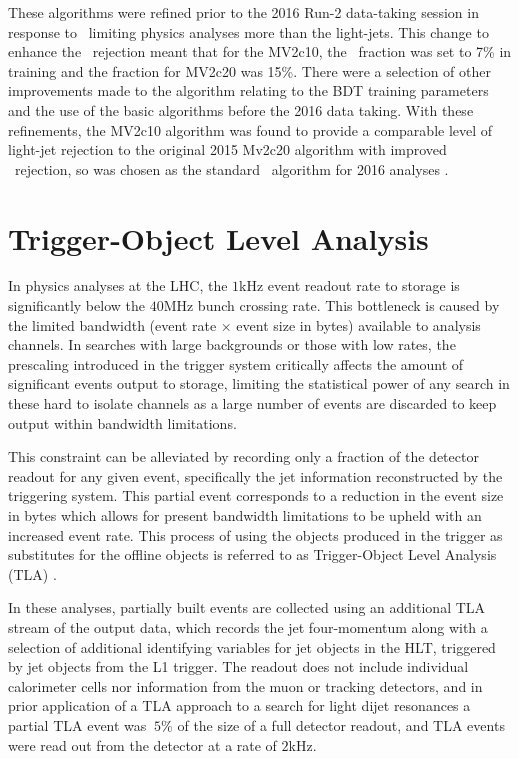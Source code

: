 	These algorithms were refined prior to the 2016 Run-2 data-taking session in response to \cjets\ limiting physics analyses more than the light-jets. This change  to enhance the \cjet\ rejection meant that for the MV2c10, the \cjet\ fraction was set to 7\% in training and the fraction for MV2c20 was 15\%. There were a selection of other improvements made to the algorithm relating to the BDT training parameters and the use of the basic algorithms before the 2016 data taking. With these refinements, the MV2c10 algorithm was found to provide a comparable level of light-jet rejection to the original 2015 Mv2c20 algorithm with improved \cjet\ rejection, so was chosen as the standard \btag\ algorithm for 2016 analyses \cite{btagOptimisation}.


\section{Trigger-Object Level Analysis}
\label{t:tla}

	In physics analyses at the LHC, the $1$kHz event readout rate to storage is significantly below the $40$MHz bunch crossing rate. This bottleneck is caused by the limited bandwidth (event rate $\times$ event size in bytes) available to analysis channels. In searches with large backgrounds or those with low rates, the prescaling introduced in the trigger system critically affects the amount of significant events output to storage, limiting the statistical power of any search in these hard to isolate channels as a large number of events are discarded to keep output within bandwidth limitations.

	This constraint can be alleviated by recording only a fraction of the detector readout for any given event, specifically the jet information reconstructed by the triggering system. This partial event corresponds to a reduction in the event size in bytes which allows for present bandwidth limitations to be upheld with an increased event rate. This process of using the objects produced in the trigger as substitutes for the offline objects is referred to as Trigger-Object Level Analysis (TLA) \cite{tla}.

	\newpage
	In these analyses, partially built events are collected using an additional TLA stream of the output data, which records the jet four-momentum along with a selection of additional identifying variables for jet objects in the HLT, triggered by jet objects from the L1 trigger. The readout does not include individual calorimeter cells nor information from the muon or tracking detectors, and in prior application of a TLA approach to a search for light dijet resonances \cite{tla} a partial TLA event was $~5\%$ of the size of a full detector readout, and TLA events were read out from the detector at a rate of $2$kHz.

\endinput
